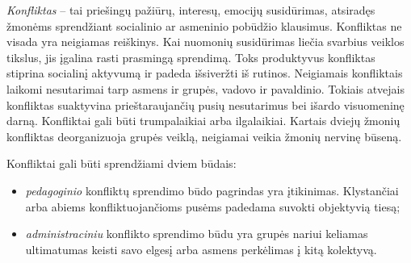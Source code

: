 \label{tema:konfliktai}

\emph{Konfliktas} – tai priešingų pažiūrų, interesų, emocijų susidūrimas, 
atsiradęs žmonėms sprendžiant socialinio ar asmeninio pobūdžio klausimus.
Konfliktas ne visada yra neigiamas reiškinys. Kai nuomonių susidūrimas 
liečia svarbius veiklos tikslus, jis įgalina rasti prasmingą sprendimą. 
Toks produktyvus konfliktas stiprina socialinį aktyvumą ir padeda 
išsiveržti iš rutinos. Neigiamais konfliktais laikomi nesutarimai tarp 
asmens ir grupės, vadovo ir pavaldinio. Tokiais atvejais konfliktas 
suaktyvina prieštaraujančių pusių nesutarimus bei išardo visuomeninę darną. 
Konfliktai gali būti trumpalaikiai arba ilgalaikiai. Kartais dviejų žmonių 
konfliktas deorganizuoja grupės veiklą, neigiamai veikia žmonių nervinę 
būseną.

Konfliktai gali būti sprendžiami dviem būdais:
\begin{itemize}
  \item \emph{pedagoginio} konfliktų sprendimo būdo pagrindas yra 
    įtikinimas. Klystančiai arba abiems konfliktuojančioms pusėms padedama 
    suvokti objektyvią tiesą;
  \item \emph{administraciniu} konflikto sprendimo būdu yra grupės nariui 
    keliamas ultimatumas keisti savo elgesį arba asmens perkėlimas į kitą 
    kolektyvą.
\end{itemize}
